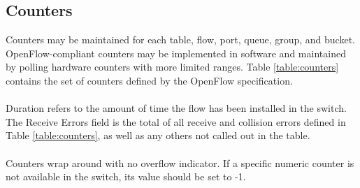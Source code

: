\documentclass[10pt]{article}
\begin{document}
\subsection{Counters}
\label{ft:counters}

Counters may be maintained for each table, flow, port, queue, group, and bucket.  OpenFlow-compliant counters may be implemented in software and maintained by polling hardware counters with more limited ranges. Table \ref{table:counters} contains the set of counters defined by the OpenFlow specification.
\\\\
Duration refers to the amount of time the flow has been installed in the switch.  The Receive Errors field is the total of all receive and collision errors defined in Table \ref{table:counters}, as well as any others not called out in the table.
\\\\
Counters wrap around with no overflow indicator. If a specific numeric counter is not available in the switch, its value should be set to -1.
\end{document}

